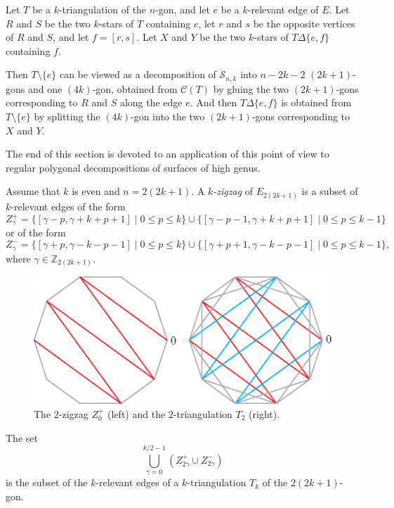 \documentclass[12pt]{amsart}
\begin{document}
\begin{remark}
Let $T$ be a $k$-triangulation of the $n$-gon, and let $e$ be a $k$-relevant edge of $E$. Let $R$ and $S$ be the two $k$-stars of $T$ containing $e$, let $r$ and $s$ be the opposite vertices of $R$ and $S$, and let $f=[r,s]$. Let $X$ and $Y$ be the two $k$-stars of $T\Delta\{e,f\}$ containing $f$.

Then $T\setminus\{e\}$ can be viewed as a decomposition of $\mathcal{S}_{n,k}$ into $n-2k-2$ $(2k+1)$-gons and one $(4k)$-gon, obtained from $\mathcal{C}(T)$ by gluing the two $(2k+1)$-gons corresponding to $R$ and $S$ along the edge $e$. And then $T\Delta\{e,f\}$ is obtained from $T\setminus\{e\}$ by splitting the $(4k)$-gon into the two $(2k+1)$-gons corresponding to $X$ and $Y$.
\end{remark}

The end of this section is devoted to an application of this point of view to regular polygonal decompositions of surfaces of high genus.

Assume that $k$ is even and $n=2(2k+1)$. A \emph{$k$-zigzag} of $E_{2(2k+1)}$ is a subset of $k$-relevant edges of the form
$$Z_\gamma^+=\{[\gamma-p,\gamma+k+p+1]\;|\; 0\le p\le k\}\cup\{[\gamma-p-1,\gamma+k+p+1]\;|\; 0\le p\le k-1\}$$
or of the form
$$Z_\gamma^-=\{[\gamma+p,\gamma-k-p-1]\;|\; 0\le p\le k\}\cup\{[\gamma+p+1,\gamma-k-p-1]\;|\; 0\le p\le k-1\},$$
where $\gamma\in\mathbb{Z}_{2(2k+1)}$.

\begin{figure}
\centerline{\includegraphics[scale=1]{10-gon.eps}}
\caption{\small{The $2$-zigzag $Z_0^+$ (left) and the $2$-triangulation $T_2$ (right).}}\label{10-gon}
\end{figure}


\begin{lemma}
The set
$$\bigcup_{\gamma=0}^{k/2-1} (Z_{2\gamma}^+\cup Z_{2\gamma}^-)$$
is the subset of the $k$-relevant edges of a $k$-triangulation $T_k$ of the $2(2k+1)$-gon.
\end{lemma}
\end{document}
